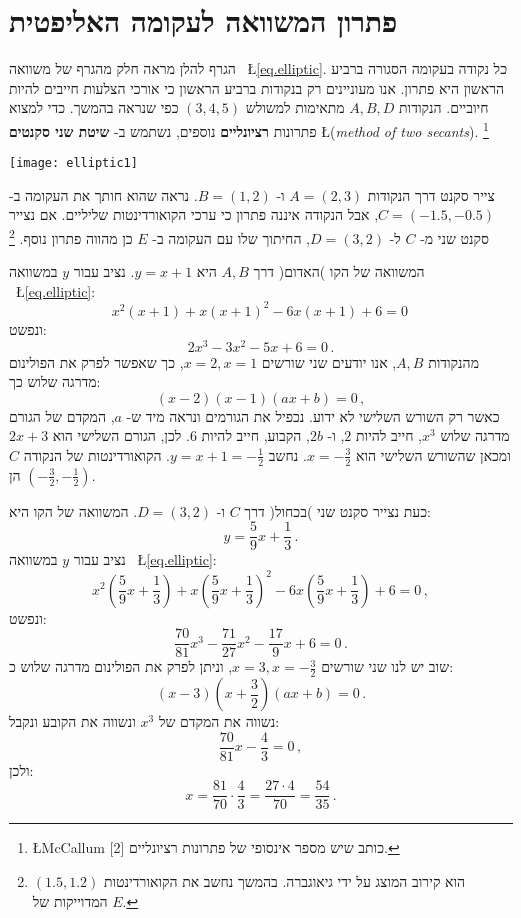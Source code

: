 \section{פתרון המשוואה לעקומה האליפטית}

הגרף להלן מראה חלק מהגרף של משוואה%
~\L{\ref{eq.elliptic}}.
כל נקודה בעקומה הסגורה ברביע הראשון היא פתרון. אנו מעוניינים רק בנקודות ברביע הראשון כי אורכי הצלעות חייבים להיות חיוביים. הנקודות 
$A,B,D$
מתאימות למשולש
$(3,4,5)$
כפי שנראה בהמשך. כדי למצוא פתרונות 
\textbf{רציונליים}
נוספים, נשתמש ב-%
\textbf{שיטת שני סקנטים}
\L{(\textit{method of two secants})}.%
\footnote{\L{McCallum [2]}
כותב שיש מספר אינסופי של פתרונות רציונליים.}
\begin{center}
\texttt{[image: elliptic1]}
\end{center}

\np

צייר סקנט דרך הנקודות
$A=(2,3)$
ו-%
$B=(1,2)$.
נראה שהוא חותך את העקומה ב-%
$C=(-1.5,-0.5)$,
אבל הנקודה איננה פתרון כי ערכי הקואורדינטות שליליים. אם נצייר סקנט שני מ-%
$C$
ל-%
$D=(3,2)$,
החיתוך שלו עם העקומה ב-%
$E$
כן מהווה פתרון נוסף.%
\footnote{$(1.5,1.2)$
הוא קירוב המוצג על ידי גיאוגברה. בהמשך נחשב את הקואורדינטות המדוייקות של
$E$.}

המשוואה של הקו )האדום( דרך 
$A,B$
היא
$y=x+1$. 
נציב עבור 
$y$
במשוואה%
~\L{\ref{eq.elliptic}}:
\[
x^2(x+1) + x(x+1)^2 -6x(x+1) +6 =0\,
\]
ונפשט:
\[
2x^3 -3x^2 -5x +6 =0\,.
\]
מהנקודות
$A,B$,
אנו יודעים שני שורשים
$x=2,x=1$,
כך שאפשר לפרק את הפולינום מדרגה שלוש כך:
\[
(x-2)(x-1)(ax+b)=0\,,
\]
כאשר רק השורש השלישי לא ידוע. נכפיל את הגורמים ונראה מיד ש-%
$a$,
המקדם של הגורם מדרגה שלוש
$x^3$,
חייב להיות
$2$,
ו-%
$2b$,
הקבוע, חייב להיות
$6$.
לכן, הגורם השלישי הוא
$2x+3$
ומכאן שהשורש השלישי הוא
$x=-\frac{3}{2}$.
נחשב
$y=x+1=-\frac{1}{2}$.
הקואורדינטות של הנקודה
$C$
הן
$(-\frac{3}{2},-\frac{1}{2})$.

כעת נצייר  סקנט שני )בכחול( דרך 
$C$
ו-%
$D=(3,2)$.
המשוואה של הקו היא:
\begin{equation}
y = \frac{5}{9}x + \frac{1}{3}\,.\label{eq.second-secant}
\end{equation}
נציב עבור 
$y$
במשוואה 
~\L{\ref{eq.elliptic}}:
\[
x^2\left(\frac{5}{9}x + \frac{1}{3}\right) + x\left(\frac{5}{9}x + \frac{1}{3}\right)^2 -6x\left(\frac{5}{9}x + \frac{1}{3}\right) +6 =0\,,
\]
ונפשט:
\[
\frac{70}{81}x^3 - \frac{71}{27}x^2 - \frac{17}{9}x +6 =0\,.
\]
שוב יש לנו שני שורשים
$x=3,x=-\frac{3}{2}$,
וניתן לפרק את הפולינום מדרגה שלוש כ:
\[
(x-3)(x+\frac{3}{2})(ax+b)=0\,.
\]
נשווה את המקדם של 
$x^3$
ונשווה את הקובע ונקבל:
\[
\frac{70}{81}x - \frac{4}{3}=0\,,
\]
ולכן:
\[
x=\frac{81}{70}\cdot \frac{4}{3}= \frac{27\cdot 4}{70} = \frac{54}{35}\,.
\]

